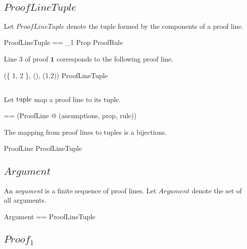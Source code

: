 \documentclass[11pt, oneside]{article}
\begin{document}
\subsection{$ProofLineTuple$}

Let $ProofLineTuple$ denote the tuple formed by the components of a proof line.

\begin{zed}
	ProofLineTuple == \finset \nat_1 \cross Prop \cross ProofRule
\end{zed}

\begin{example}
Line 3 of proof $\mathbf{1}$ corresponds to the following proof line.

\begin{zed}
	(\{ 1, 2 \}, \varProp(\propQ), (1,2)) \in ProofLineTuple
\end{zed}

\end{example}

\subsection{}

Let $\operatorname{tuple}$ map a proof line to its tuple.

\begin{zed}
	\proofLineTuple == (\lambda ProofLine @ (assumptions, prop, rule))
\end{zed}

\begin{remark}
The mapping from proof lines to tuples is a bijections.

\begin{zed}
	\proofLineTuple \in ProofLine \bij ProofLineTuple
\end{zed}

\end{remark}

\subsection{$Argument$}

An {\it argument} is a finite sequence of proof lines.
Let $Argument$ denote the set of all arguments.

\begin{zed}
	Argument == \seq ProofLineTuple
\end{zed}

\subsection{$Proof_1$}
\end{document}
